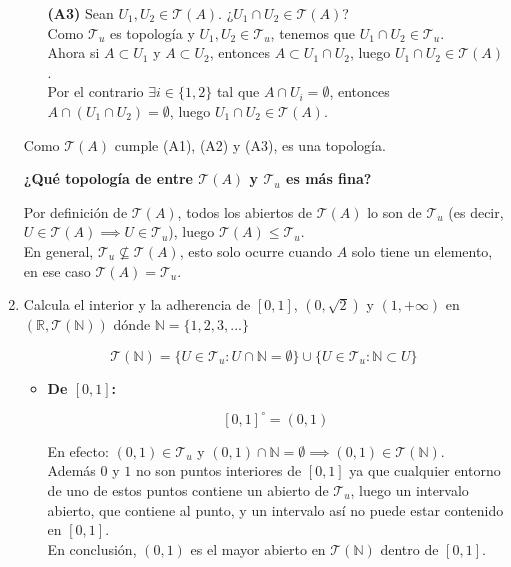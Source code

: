 \documentclass[12pt]{article}
\begin{document}
\begin{ejercicio}[2 puntos]
\begin{enumerate}[label=(\alph*)]
\begin{itemize}[leftmargin=*]
                    \item[\textbf{(A3)}] Sean $U_1, U_2 \in \mathcal{T}(A)$. ¿$U_1 \cap U_2 \in \mathcal{T}(A)$?\\
                    Como $\mathcal{T}_u$ es topología y $U_1, U_2 \in \mathcal{T}_u$, tenemos que $U_1 \cap U_2 \in \mathcal{T}_u$.\\
                    Ahora si $A \subset U_1$ y $A \subset U_2$, entonces $A \subset U_1 \cap U_2$, luego $U_1 \cap U_2 \in \mathcal{T}(A)$.\\
                    Por el contrario $\exists i \in \{1, 2\}$ tal que $A \cap U_i = \emptyset$, entonces $A \cap (U_1 \cap U_2) = \emptyset$, luego $U_1 \cap U_2 \in \mathcal{T}(A)$.
                \end{itemize}
                
                Como $\mathcal{T}(A)$ cumple (A1), (A2) y (A3), es una topología.
                
                \textbf{¿Qué topología de entre $\mathcal{T}(A)$ y $\mathcal{T}_u$ es más fina?}
                
                Por definición de $\mathcal{T}(A)$, todos los abiertos de $\mathcal{T}(A)$ lo son de $\mathcal{T}_u$ (es decir, $U \in \mathcal{T}(A) \implies U \in \mathcal{T}_u$), luego $\mathcal{T}(A) \le \mathcal{T}_u$.\\
                En general, $\mathcal{T}_u \nsubseteq \mathcal{T}(A)$, esto solo ocurre cuando $A$ solo tiene un elemento, en ese caso $\mathcal{T}(A) = \mathcal{T}_u$.
            
            \item Calcula el interior y la adherencia de $[0, 1]$, $(0,\sqrt{2})$ y $(1,+\infty)$ en $(\mathbb{R},\mathcal{T}(\mathbb{N}))$ dónde $\mathbb{N}=\{1,2,3,...\}$
            
                $$\mathcal{T}(\mathbb{N}) = \{U \in \mathcal{T}_u : U \cap \mathbb{N} = \emptyset\} \cup \{U \in \mathcal{T}_u : \mathbb{N} \subset U\}$$

                \begin{itemize}[leftmargin=*]
                    \item \textbf{De $[0, 1]$:}
                    
                    $$[0, 1]^\circ = (0, 1)$$
                    
                    En efecto: $(0, 1) \in \mathcal{T}_u$ y $(0, 1) \cap \mathbb{N} = \emptyset \implies (0, 1) \in \mathcal{T}(\mathbb{N})$.\\
                    Además $0$ y $1$ no son puntos interiores de $[0, 1]$ ya que cualquier entorno de uno de estos puntos contiene un abierto de $\mathcal{T}_u$, luego un intervalo abierto, que contiene al punto, y un intervalo así no puede estar contenido en $[0, 1]$.\\
                    En conclusión, $(0, 1)$ es el mayor abierto en $\mathcal{T}(\mathbb{N})$ dentro de $[0, 1]$.
                

\end{itemize}
\end{enumerate}
\end{ejercicio}
\end{document}
